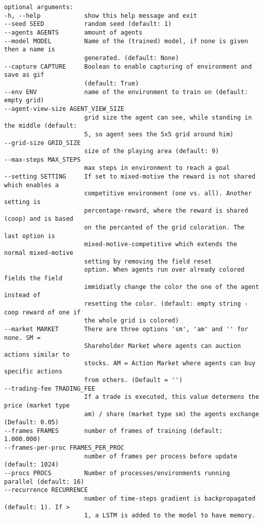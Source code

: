 {\begin{verbatim}
optional arguments:
-h, --help            show this help message and exit
--seed SEED           random seed (default: 1)
--agents AGENTS       amount of agents
--model MODEL         Name of the (trained) model, if none is given then a name is 
                      generated. (default: None)
--capture CAPTURE     Boolean to enable capturing of environment and save as gif 
                      (default: True)
--env ENV             name of the environment to train on (default: empty grid)
--agent-view-size AGENT_VIEW_SIZE
                      grid size the agent can see, while standing in the middle (default: 
                      5, so agent sees the 5x5 grid around him)
--grid-size GRID_SIZE
                      size of the playing area (default: 9)
--max-steps MAX_STEPS
                      max steps in environment to reach a goal
--setting SETTING     If set to mixed-motive the reward is not shared which enables a
                      competitive environment (one vs. all). Another setting is 
                      percentage-reward, where the reward is shared (coop) and is based 
                      on the percanted of the grid coloration. The last option is 
                      mixed-motive-competitive which extends the normal mixed-motive 
                      setting by removing the field reset
                      option. When agents run over already colored fields the field 
                      immidiatly change the color the one of the agent instead of 
                      resetting the color. (default: empty string - coop reward of one if 
                      the whole grid is colored)
--market MARKET       There are three options 'sm', 'am' and '' for none. SM =       
                      Shareholder Market where agents can auction actions similar to 
                      stocks. AM = Action Market where agents can buy specific actions 
                      from others. (Default = '')
--trading-fee TRADING_FEE
                      If a trade is executed, this value determens the price (market type 
                      am) / share (market type sm) the agents exchange (Default: 0.05)
--frames FRAMES       number of frames of training (default: 1.000.000)
--frames-per-proc FRAMES_PER_PROC
                      number of frames per process before update (default: 1024)
--procs PROCS         Number of processes/environments running parallel (default: 16)
--recurrence RECURRENCE
                      number of time-steps gradient is backpropagated (default: 1). If > 
                      1, a LSTM is added to the model to have memory.

\end{verbatim}}
